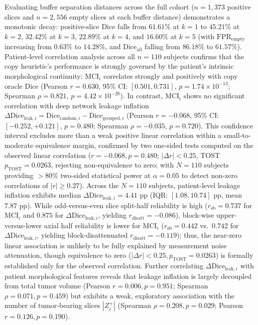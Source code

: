 \documentclass[11pt,a4paper]{article}
\begin{document}
Evaluating buffer separation distances across the full cohort ($n=1,373$ positive slices and $n=2,556$ empty slices at each buffer distance) demonstrates a monotonic decay: positive-slice Dice falls from $61.61\%$ at $k=1$ to $45.21\%$ at $k=2$, $32.42\%$ at $k=3$, $22.89\%$ at $k=4$, and $16.60\%$ at $k=5$ (with $\text{FPR}_{\text{empty}}$ increasing from $0.63\%$ to $14.28\%$, and $\text{Dice}_{\text{all}}$ falling from $86.18\%$ to $61.57\%$). Patient-level correlation analysis across all $n=110$ subjects confirms that the copy heuristic's performance is strongly governed by the patient's intrinsic morphological continuity: $\text{MCI}_i$ correlates strongly and positively with copy oracle Dice (Pearson $r = 0.630$, 95\% CI: $[0.501, 0.731]$, $p = 1.74 \times 10^{-13}$; Spearman $\rho = 0.821$, $p = 4.42 \times 10^{-28}$). In contrast, $\text{MCI}_i$ shows no significant correlation with deep network leakage inflation $\Delta\text{Dice}_{\text{leak}, i} = \text{Dice}_{\text{random}, i} - \text{Dice}_{\text{grouped}, i}$ (Pearson $r = -0.068$, 95\% CI: $[-0.252, +0.121]$, $p = 0.480$; Spearman $\rho = -0.035$, $p = 0.720$). This confidence interval excludes more than a weak positive linear correlation within a small-to-moderate equivalence margin, confirmed by two one-sided tests computed on the observed linear correlation ($r = -0.068, p = 0.480$; $|\Delta r| < 0.25$, TOST $p_{\text{TOST}} = 0.0263$, rejecting non-equivalence to zero; with $N = 110$ subjects providing $>80\%$ two-sided statistical power at $\alpha = 0.05$ to detect non-zero correlations of $|r| \ge 0.27$). Across the $N = 110$ subjects, patient-level leakage inflation exhibits median $\Delta\text{Dice}_{\text{leak}, i} = 4.41\text{ pp}$ (IQR: $[1.08, 10.74]\text{ pp}$, mean $7.87\text{ pp}$). While odd-versus-even slice split-half reliability is high ($r_{\text{sb}} = 0.737$ for $\text{MCI}_i$ and $0.875$ for $\Delta\text{Dice}_{\text{leak}, i}$, yielding $r_{\text{disatt}} = -0.086$), block-wise upper-versus-lower axial half reliability is lower for $\text{MCI}_i$ ($r_{\text{sb}} = 0.442$ vs.\ $0.742$ for $\Delta\text{Dice}_{\text{leak}, i}$, yielding block-disattenuated $r_{\text{disatt}} = -0.119$); thus, the near-zero linear association is unlikely to be fully explained by measurement noise attenuation, though equivalence to zero ($|\Delta r| < 0.25, p_{\text{TOST}} = 0.0263$) is formally established only for the observed correlation. Further correlating $\Delta\text{Dice}_{\text{leak}, i}$ with patient morphological features reveals that leakage inflation is largely decoupled from total tumor volume (Pearson $r = 0.006, p = 0.951$; Spearman $\rho = 0.071, p = 0.459$) but exhibits a weak, exploratory association with the number of tumor-bearing slices $|Z_i^+|$ (Spearman $\rho = 0.208, p = 0.029$; Pearson $r = 0.126, p = 0.190$).
\end{document}
